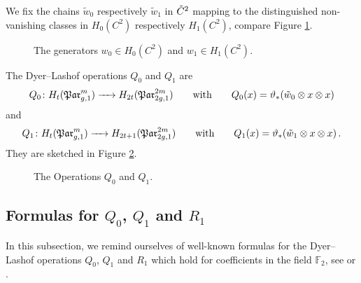 \begin{defi}
    \label{homology_operations:parallel_patching_slit_pics:generators_w}
    We fix the chains $\tilde w_0$ respectively $\tilde w_1$ in $\cspc 2$ mapping to the distinguished non-vanishing classes in $H_0(C^2)$ respectively $H_1(C^2)$,
    compare Figure \ref{homology_operations:parallel_patching_slit_pics:w_0_and_w_1}.
\end{defi}

\begin{figure}[ht]
    \centering
    \def\svgwidth{.2\columnwidth}
    
    \hspace{3cm}
    \def\svgwidth{.2\columnwidth}
    
    \caption{\label{homology_operations:parallel_patching_slit_pics:w_0_and_w_1}The generators $w_0 \in H_0(C^2)$ and $w_1 \in H_1(C^2)$.}
\end{figure}
\begin{defi}
    \label{homology_operations:parallel_patching_slit_pics:Q_0_and_Q_1}
    The Dyer--Lashof operations $Q_0$ and $Q_1$ are
    \[
        Q_0 \colon H_t( \Par_{g,1}^m ) \to H_{2t}(\Par_{2g,1}^{2m}) \mspc{with}{20} Q_0(x) = \vartheta_\ast( \tilde w_0 \otimes x \otimes x )
    \]
    and
    \[
        Q_1 \colon H_t( \Par_{g,1}^m ) \to H_{2t+1}(\Par_{2g,1}^{2m}) \mspc{with}{20} Q_1(x) = \vartheta_\ast( \tilde w_1 \otimes x \otimes x ) \,.
    \]
    They are sketched in Figure \ref{homology_operations:parallel_patching_slit_pics:w_0_and_w_1_applied}.
\end{defi}
\begin{figure}[ht]
    \centering
    \def\svgwidth{.2\columnwidth}
    
    \hspace{3cm}
    \def\svgwidth{.2\columnwidth}
    
    \caption{\label{homology_operations:parallel_patching_slit_pics:w_0_and_w_1_applied}The Operations $Q_0$ and $Q_1$.}
\end{figure}

\subsection{Formulas for \texorpdfstring{$Q_0$}{Q0}, \texorpdfstring{$Q_1$}{Q1} and \texorpdfstring{$R_1$}{R1}}
In this subsection, we remind ourselves of well-known formulas for the Dyer--Lashof operations $Q_0$, $Q_1$ and $R_1$ which hold for coefficients in the field $\mathbb F_2$,
see \cite[Pages 214--218]{CohenLadaMay1976} or \cite[Sections 4.3--4.5]{Boedigheimer19902}.

